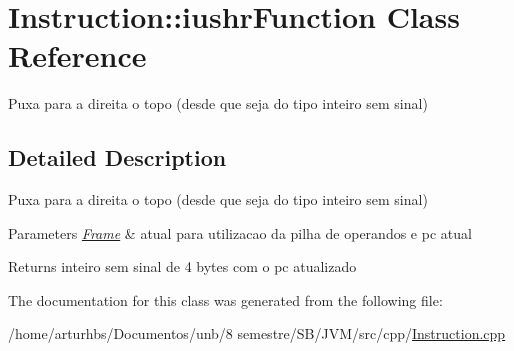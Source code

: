 \hypertarget{classInstruction_1_1iushrFunction}{}\section{Instruction\+:\+:iushr\+Function Class Reference}
\label{classInstruction_1_1iushrFunction}


Puxa para a direita o topo (desde que seja do tipo inteiro sem sinal)  




\subsection{Detailed Description}
Puxa para a direita o topo (desde que seja do tipo inteiro sem sinal) 


\begin{DoxyParams}{Parameters}
{\em \hyperlink{classFrame}{Frame}} & atual para utilizacao da pilha de operandos e pc atual \\
\hline
\end{DoxyParams}
\begin{DoxyReturn}{Returns}
inteiro sem sinal de 4 bytes com o pc atualizado 
\end{DoxyReturn}


The documentation for this class was generated from the following file\+:\begin{DoxyCompactItemize}
\item 
/home/arturhbs/\+Documentos/unb/8 semestre/\+S\+B/\+J\+V\+M/src/cpp/\hyperlink{Instruction_8cpp}{Instruction.\+cpp}\end{DoxyCompactItemize}
